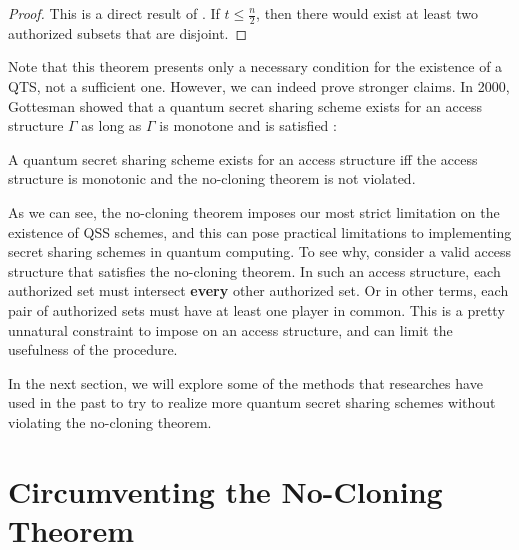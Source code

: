 \begin{proof}
    This is a direct result of . If $t \leq \frac{n}{2}$, then there would exist at least two authorized subsets that are disjoint. 
\end{proof}

Note that this theorem presents only a necessary condition for the existence of a QTS, not a sufficient one. However, we can indeed prove stronger claims. In 2000, Gottesman showed that a quantum secret sharing scheme exists for an access structure $\Gamma$ as long as $\Gamma$ is monotone and  is satisfied \cite{gottesman_theory_2000}:

\begin{theorem}
    \label{thm:monotone-gamma}
    A quantum secret sharing scheme exists for an access structure iff the access structure is monotonic and the no-cloning theorem is not violated.
\end{theorem}

As we can see, the no-cloning theorem imposes our most strict limitation on the existence of QSS schemes, and this can pose practical limitations to implementing secret sharing schemes in quantum computing. To see why, consider a valid access structure that satisfies the no-cloning theorem. In such an access structure, each authorized set must intersect \textbf{every} other authorized set. Or in other terms, each pair of authorized sets must have at least one player in common. This is a pretty unnatural constraint to impose on an access structure, and can limit the usefulness of the procedure.

In the next section, we will explore some of the methods that researches have used in the past to try to realize more quantum secret sharing schemes without violating the no-cloning theorem.

\section{Circumventing the No-Cloning Theorem}



